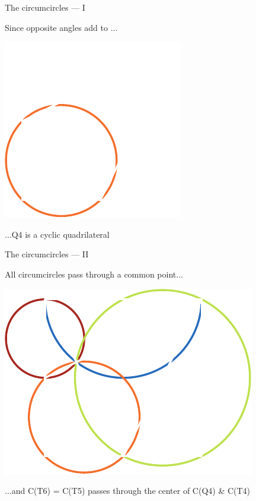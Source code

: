 \documentclass[14pt]{beamer}
\begin{document}

    \begin{frame}{The circumcircles --- I}
        \begin{center}
            Since opposite angles add to \textpi...
        \end{center}
        \vspace{0.90em}
        \hspace{5.25em} \includegraphics[scale=1.]{figures/figure019b.pdf} \\
        \begin{center}
            ...Q4 is a cyclic quadrilateral
        \end{center}
    \end{frame}


    \begin{frame}{The circumcircles --- II}
        \begin{center}
            All circumcircles pass through a common point...
        \end{center}
        \hspace{3.92em} \includegraphics[scale=1.0]{figures/figure019c.pdf} \\
        \begin{center}
            \footnotesize ...and C(T6) = C(T5) passes through the center of C(Q4) \& C(T4)
        \end{center}
    \end{frame}
\end{document}

